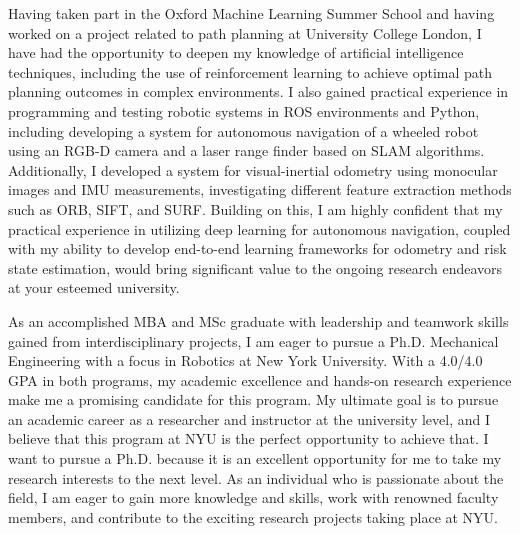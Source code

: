 \documentclass[a4,20pt]{article}
\begin{document}
\begin{large}
\vspace{-0.25cm} \quad Having taken part in the Oxford Machine Learning Summer School and having worked on a project related to path planning at University College London, I have had the opportunity to deepen my knowledge of artificial intelligence techniques, including the use of reinforcement learning to achieve optimal path planning outcomes in complex environments. I also gained practical experience in programming and testing robotic systems in ROS environments and Python, including developing a system for autonomous navigation of a wheeled robot using an RGB-D camera and a laser range finder based on SLAM algorithms. Additionally, I developed a system for visual-inertial odometry using monocular images and IMU measurements, investigating different feature extraction methods such as ORB, SIFT, and SURF. Building on this, I am highly confident that my practical experience in utilizing deep learning for autonomous navigation, coupled with my ability to develop end-to-end learning frameworks for odometry and risk state estimation, would bring significant value to the ongoing research endeavors at your esteemed university.\par



\vspace{-0.25cm} \quad As an accomplished MBA and MSc graduate with leadership and teamwork skills gained from interdisciplinary projects, I am eager to pursue a Ph.D. Mechanical Engineering with a focus in Robotics at New York University. With a 4.0/4.0 GPA in both programs, my academic excellence and hands-on research experience make me a promising candidate for this program. My ultimate goal is to pursue an academic career as a researcher and instructor at the university level, and I believe that this program at NYU is the perfect opportunity to achieve that. I want to pursue a Ph.D. because it is an excellent opportunity for me to take my research interests to the next level. As an individual who is passionate about the field, I am eager to gain more knowledge and skills, work with renowned faculty members, and contribute to the exciting research projects taking place at NYU.\par


\end{large}
\end{document}
